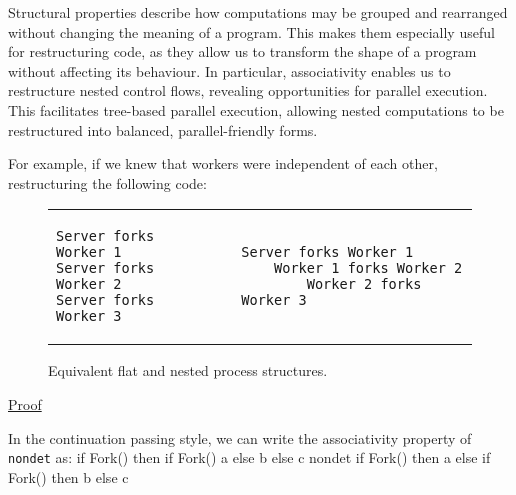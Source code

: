 \documentclass[logo,bsc,singlespacing,parskip]{infthesis}
\begin{document}
Structural properties describe how computations may be grouped and rearranged without changing the meaning of a program. This makes them especially useful for restructuring code, as they allow us to transform the shape of a program without affecting its behaviour. In particular, associativity enables us to restructure nested control flows, revealing opportunities for parallel execution. This facilitates tree-based parallel execution, allowing nested computations to be restructured into balanced, parallel-friendly forms.

For example, if we knew that workers were independent of each other, restructuring the following code:
\vspace{-1em} %
\begin{figure}[H]
    \centering
    \begin{tabular}{p{} c p{}}
        \begin{lstlisting}
Server forks Worker 1
Server forks Worker 2
Server forks Worker 3
        \end{lstlisting}
        &
        &
        \begin{lstlisting}
Server forks Worker 1
    Worker 1 forks Worker 2
        Worker 2 forks Worker 3
        \end{lstlisting}
    \end{tabular}
    \vspace{-1em} %

    \caption{Equivalent flat and nested process structures.}
    \label{fig:process-restructuring}
\end{figure}



\underline{Proof}

In the continuation passing style, we can write the associativity property of \texttt{nondet} as:
{
if Fork() then
if Fork() 
a 
else 
b 
else 
c
}
{nondet}
{
if Fork() then a 
else 
if Fork() 
 then b 
 else c
}
\end{document}
